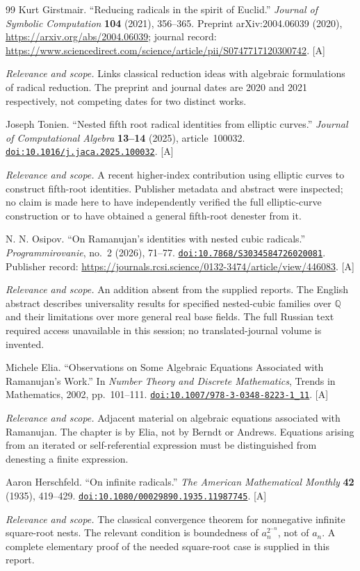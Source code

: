 \documentclass[11pt,oneside]{article}
\numberwithin{equation}{section}
\theoremstyle{definition}
\theoremstyle{remark}
\newcommand{\Q}{\mathbb{Q}}
\newcommand{\doi}[1]{\href{https://doi.org/#1}{\nolinkurl{doi:#1}}}
\newcommand{\status}[1]{\textsf{\small[#1]}}
\newcommand{\entrynote}[1]{\par\smallskip\noindent\emph{Relevance and scope.} #1}
\begin{document}
\begin{thebibliography}{99}
Kurt Girstmair. ``Reducing radicals in the spirit of Euclid.'' \emph{Journal of Symbolic Computation} \textbf{104} (2021), 356--365. Preprint arXiv:2004.06039 (2020), \url{https://arxiv.org/abs/2004.06039}; journal record: \url{https://www.sciencedirect.com/science/article/pii/S0747717120300742}. \status{A}
\entrynote{Links classical reduction ideas with algebraic formulations of radical reduction. The preprint and journal dates are 2020 and 2021 respectively, not competing dates for two distinct works.}

Joseph Tonien. ``Nested fifth root radical identities from elliptic curves.'' \emph{Journal of Computational Algebra} \textbf{13--14} (2025), article~100032. \doi{10.1016/j.jaca.2025.100032}. \status{A}
\entrynote{A recent higher-index contribution using elliptic curves to construct fifth-root identities. Publisher metadata and abstract were inspected; no claim is made here to have independently verified the full elliptic-curve construction or to have obtained a general fifth-root denester from it.}

N. N. Osipov. ``On Ramanujan's identities with nested cubic radicals.'' \emph{Programmirovanie}, no.~2 (2026), 71--77. \doi{10.7868/S3034584726020081}. Publisher record: \url{https://journals.rcsi.science/0132-3474/article/view/446083}. \status{A}
\entrynote{An addition absent from the supplied reports. The English abstract describes universality results for specified nested-cubic families over $\Q$ and their limitations over more general real base fields. The full Russian text required access unavailable in this session; no translated-journal volume is invented.}

Michele Elia. ``Observations on Some Algebraic Equations Associated with Ramanujan's Work.'' In \emph{Number Theory and Discrete Mathematics}, Trends in Mathematics, 2002, pp.~101--111. \doi{10.1007/978-3-0348-8223-1_11}. \status{A}
\entrynote{Adjacent material on algebraic equations associated with Ramanujan. The chapter is by Elia, not by Berndt or Andrews. Equations arising from an iterated or self-referential expression must be distinguished from denesting a finite expression.}

Aaron Herschfeld. ``On infinite radicals.'' \emph{The American Mathematical Monthly} \textbf{42} (1935), 419--429. \doi{10.1080/00029890.1935.11987745}. \status{A}
\entrynote{The classical convergence theorem for nonnegative infinite square-root nests. The relevant condition is boundedness of $a_n^{2^{-n}}$, not of $a_n$. A complete elementary proof of the needed square-root case is supplied in this report.}


\end{thebibliography}
\end{document}
